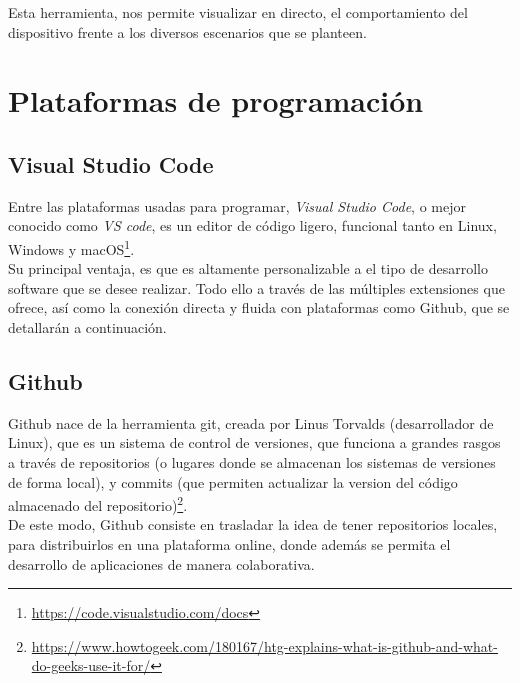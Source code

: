 Esta herramienta, nos permite visualizar en directo, el comportamiento del dispositivo frente a los diversos escenarios que se planteen.

\section{Plataformas de programación}
\label{sec:plataformas_de_programacion}

\subsection{Visual Studio Code}
\label{subsec:visual_studio_code}


Entre las plataformas usadas para programar, \emph{Visual Studio Code}, o mejor conocido como \emph{VS code}, es un editor de código ligero, funcional tanto en Linux, Windows y macOS\footnote[9]{\url{https://code.visualstudio.com/docs}}.\\

Su principal ventaja, es que es altamente personalizable a el tipo de desarrollo software que se desee realizar. Todo ello a través de las múltiples extensiones que ofrece, así como la conexión directa y fluida con plataformas como Github, que se detallarán a continuación.\\

\subsection{Github}
\label{subsec:github}

Github nace de la herramienta git, creada por Linus Torvalds (desarrollador de Linux), que es un sistema de control de versiones, que funciona a grandes rasgos a través de repositorios (o lugares donde se almacenan los sistemas de versiones de forma local), y commits (que permiten actualizar la version del código almacenado del repositorio)\footnote[10]{\url{https://www.howtogeek.com/180167/htg-explains-what-is-github-and-what-do-geeks-use-it-for/}}.\\

De este modo, Github consiste en trasladar la idea de tener repositorios locales, para distribuirlos en una plataforma online, donde además se permita el desarrollo de aplicaciones de manera colaborativa.\\

